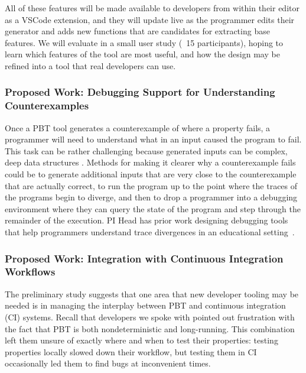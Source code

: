 All of these features will be made available to developers from within their
editor as a VSCode extension, and they will update live as the programmer edits
their generator and adds new functions that are candidates for extracting base
features. We will evaluate \genvis{} in a small user study (~15 participants),
hoping to learn which features of the tool are most useful, and how the design
may be refined into a tool that real developers can use.

\subsubsection{Proposed Work: Debugging Support for Understanding Counterexamples}

Once a PBT tool generates a counterexample of where a property fails, a
programmer will need to understand what in an input caused the program to fail.
This task can be rather challenging because generated inputs can be complex,
deep data structures . Methods for making it clearer why a counterexample
fails could be to generate additional inputs that are very close to the
counterexample that are actually correct, to run the program up to the point
where the traces of the programs begin to diverge, and then to drop a programmer
into a debugging environment where they can query the state of the program and
step through the remainder of the execution. PI Head has prior work designing
debugging tools that help programmers understand trace divergences in an
educational setting~\cite{suzuki2017tracediff}.   

\subsubsection{Proposed Work: Integration with Continuous Integration Workflows}

The preliminary study suggests that one area that new developer tooling may be
needed is in managing the interplay between PBT and continuous integration (CI)
systems. Recall that developers we spoke with pointed out frustration with the
fact that PBT is both nondeterministic and long-running. This combination left
them unsure of exactly where and when to test their properties: testing
properties locally slowed down their workflow, but testing them in CI
occasionally led them to find bugs at inconvenient times.

